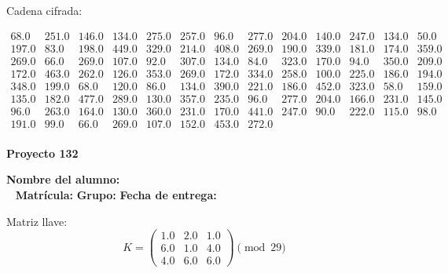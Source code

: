 \documentclass[12pt]{article}
\begin{document}
Cadena cifrada:
\begin{center}
$\begin{array}{lllllllllllll}
68.0 & 251.0 & 146.0 & 134.0 & 275.0 & 257.0 & 96.0 & 277.0 & 204.0 & 140.0 & 247.0 & 134.0 & 50.0\\
197.0 & 83.0 & 198.0 & 449.0 & 329.0 & 214.0 & 408.0 & 269.0 & 190.0 & 339.0 & 181.0 & 174.0 & 359.0\\
269.0 & 66.0 & 269.0 & 107.0 & 92.0 & 307.0 & 134.0 & 84.0 & 323.0 & 170.0 & 94.0 & 350.0 & 209.0\\
172.0 & 463.0 & 262.0 & 126.0 & 353.0 & 269.0 & 172.0 & 334.0 & 258.0 & 100.0 & 225.0 & 186.0 & 194.0\\
348.0 & 199.0 & 68.0 & 120.0 & 86.0 & 134.0 & 390.0 & 221.0 & 186.0 & 452.0 & 323.0 & 58.0 & 159.0\\
135.0 & 182.0 & 477.0 & 289.0 & 130.0 & 357.0 & 235.0 & 96.0 & 277.0 & 204.0 & 166.0 & 231.0 & 145.0\\
96.0 & 263.0 & 164.0 & 130.0 & 360.0 & 231.0 & 170.0 & 441.0 & 247.0 & 90.0 & 222.0 & 115.0 & 98.0\\
191.0 & 99.0 & 66.0 & 269.0 & 107.0 & 152.0 & 453.0 & 272.0\\
\end{array}$
\end{center}

\newpage


\textbf{Proyecto 132}

\textbf{Nombre del alumno:} \underline{\hspace{13cm}}\\\
\vspace{1cm}
\textbf{Matrícula:} \underline{\hspace{4cm}} \hspace{1cm}
\textbf{Grupo:} \underline{\hspace{2cm}}
\textbf{Fecha de entrega:} \underline{\hspace{2cm}}

\medskip

Matriz llave:
\[
K = \begin{pmatrix}
1.0 & 2.0 & 1.0\\
6.0 & 1.0 & 4.0\\
4.0 & 6.0 & 6.0
\end{pmatrix} \pmod{29}
\]
\end{document}
